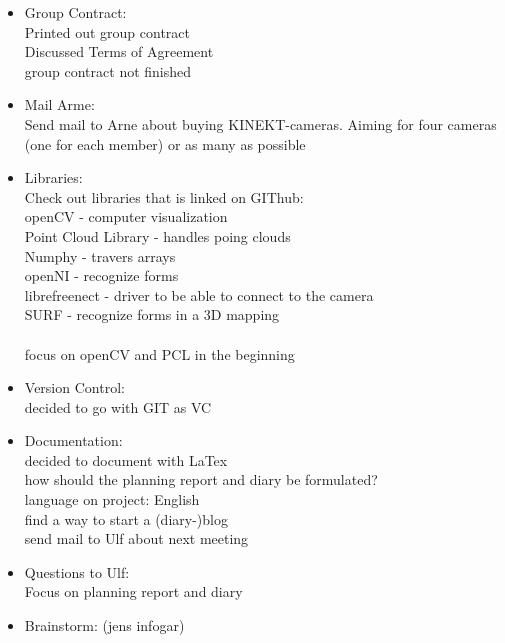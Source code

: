 \documentclass[11pt]{article}
\begin{document}
\begin{itemize}

   \item Group Contract: \\
         Printed out group contract \\
         Discussed Terms of Agreement \\
         group contract not finished \\

   \item Mail Arme: \\
         Send mail to Arne about buying KINEKT-cameras. Aiming for four cameras (one for each member) or as many as possible

   \item Libraries: \\
         Check out libraries that is linked on GIThub: \\
         openCV - computer visualization \\
         Point Cloud Library - handles poing clouds \\
         Numphy - travers arrays \\
         openNI - recognize forms \\
         librefreenect - driver to be able to connect to the camera \\
         SURF - recognize forms in a 3D mapping \\
         \\
         focus on openCV and PCL in the beginning 

   \item Version Control: \\
         decided to go with GIT as VC

   \item Documentation: \\
         decided to document with LaTex \\
         how should the planning report and diary be formulated? \\
         language on project: English \\
         find a way to start a (diary-)blog \\
         send mail to Ulf about next meeting 

   \item Questions to Ulf: \\
         Focus on planning report and diary
   
   \item Brainstorm: (jens infogar)

\end{itemize}
\end{document}

